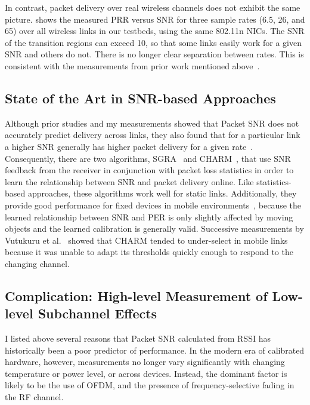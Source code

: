 In contrast, packet delivery over real wireless channels does not exhibit the same picture.  shows the measured PRR versus SNR for three sample rates (6.5\Mbps, 26\Mbps, and 65\Mbps) over all wireless links in our testbeds, using the same 802.11n NICs. The SNR of the transition regions can exceed 10\dB, so that some links easily work for a given SNR and others do not. There is no longer clear separation between rates. This is consistent with the measurements from prior work mentioned above~\cite{Aguayo_Roofnet, Judd_CHARM, Reis_interference, Zhang_SNRguided, Zhao_sensys03}.

\subsection{State of the Art in SNR-based Approaches}
Although prior studies and my measurements showed that Packet SNR does not accurately predict delivery across links, they also found that for a particular link a higher SNR generally has higher packet delivery for a given rate~\cite{Aguayo_Roofnet,Judd_CHARM,Zhang_SNRguided}. Consequently, there are two algorithms, SGRA~\cite{Zhang_SNRguided} and CHARM~\cite{Judd_CHARM}, that use SNR feedback from the receiver in conjunction with packet loss statistics in order to learn the relationship between SNR and packet delivery online. Like statistics-based approaches, these algorithms work well for static links. Additionally, they provide good performance for fixed devices in mobile environments~\cite{Judd_CHARM}, because the learned relationship between SNR and PER is only slightly affected by moving objects and the learned calibration is generally valid. Successive measurements by Vutukuru et al.~\cite{Vutukuru_SoftRate} showed that CHARM tended to under-select in mobile links because it was unable to adapt its thresholds quickly enough to respond to the changing channel.

\subsection{Complication: High-level Measurement of Low-level Subchannel Effects}
I listed above several reasons that Packet SNR calculated from RSSI has historically been a poor predictor of performance. In the modern era of calibrated hardware, however, measurements no longer vary significantly with changing temperature or power level, or across devices. Instead, the dominant factor is likely to be the use of OFDM, and the presence of frequency-selective fading in the RF channel.

